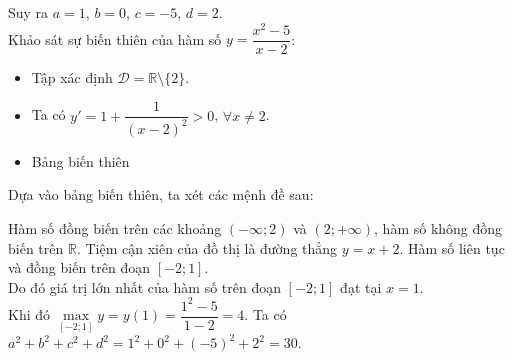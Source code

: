 \begin{ex}
{		Suy ra $a=1$, $b=0$, $c=-5$, $d=2$.\\		
		Khảo sát sự biến thiên của hàm số $y=\dfrac{x^2-5}{x-2}$:
		\begin{itemize}
			\item Tập xác định $\mathscr{D}=\mathbb{R}\setminus\{2\}$.
			\item Ta có $y'=1+\dfrac{1}{(x-2)^2}>0$, $\forall x\neq 2$.
			\item Bảng biến thiên
			\begin{center}
			\end{center}
		\end{itemize}
		Dựa vào bảng biến thiên, ta xét các mệnh đề sau:
		\begin{itemchoice}
			\itemch Hàm số đồng biến trên các khoảng $(-\infty; 2)$ và $(2; +\infty)$, hàm số không đồng biến trên $\mathbb{R}$.
			\itemch Tiệm cận xiên của đồ thị là đường thẳng $y=x+2$.
			\itemch Hàm số liên tục và đồng biến trên đoạn $[-2;1]$.\\ 
			Do đó giá trị lớn nhất của hàm số trên đoạn $[-2;1]$ đạt tại $x=1$.\\
			Khi đó $\max\limits_{[-2;1]} y=y(1)=\dfrac{1^2-5}{1-2}=4$.
			\itemch Ta có $a^2+b^2+c^2+d^2=1^2+0^2+(-5)^2+2^2=30$.
		\end{itemchoice}
	}
\end{ex}

